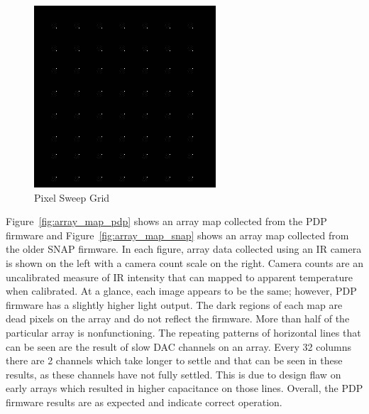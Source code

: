             \begin{figure}[t]
                \centering
                \includegraphics{fig/grid.jpg}
                \caption{Pixel Sweep Grid}
                \label{fig:grid_sweep}
            \end{figure}

            Figure~\ref{fig:array_map_pdp} shows an array map collected from the PDP firmware and Figure~\ref{fig:array_map_snap} shows an array map collected from the older SNAP firmware. In each figure, array data collected using an IR camera is shown on the left with a camera count scale on the right. Camera counts are an uncalibrated measure of IR intensity that can mapped to apparent temperature when calibrated. At a glance, each image appears to be the same; however, PDP firmware has a slightly higher light output. The dark regions of each map are dead pixels on the array and do not reflect the firmware. More than half of the particular array is nonfunctioning. The repeating patterns of horizontal lines that can be seen are the result of slow DAC channels on an array. Every 32 columns there are 2 channels which take longer to settle and that can be seen in these results, as these channels have not fully settled. This is due to design flaw on early arrays which resulted in higher capacitance on those lines. Overall, the PDP firmware results are as expected and indicate correct operation.


